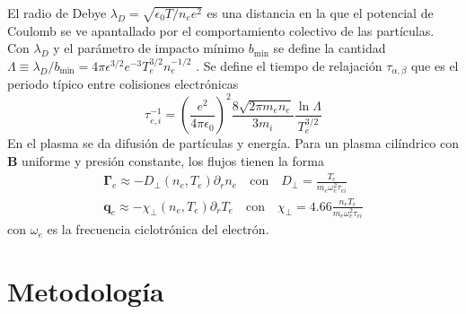  El radio de Debye $\lambda_D = \sqrt{\epsilon_0 T / n_e e^2}$ es una distancia en la que el potencial de Coulomb se ve apantallado por el comportamiento colectivo de las partículas. Con $\lambda_D$ y el parámetro de impacto mínimo $b_\text{min}$ se define la cantidad $\Lambda \equiv \lambda_D/ b_\text{min} = 4\pi \epsilon^{3/2} e^{-3} T_e^{3/2} n_e^{-1/2}$ \cite{goldston1995, helander2005}. Se define el tiempo de relajación $\tau_{\alpha, \beta}$ que es el periodo típico entre colisiones electrónicas
\begin{equation*}
	\tau_{e, i}^{-1} = \left(\frac{e^2}{4\pi\epsilon_0}\right)^2 \frac{8\sqrt{2\pi m_e n_e}}{3 m_i}\frac{\ln{\Lambda}}{T_e^{3/2}}
\end{equation*}
En el plasma se da difusión de partículas y energía. Para un plasma cilíndrico con $\bm{B}$ uniforme y presión constante, los flujos tienen la forma \cite{helander2005}
\begin{eqnarray}\label{eq:diffusion}
	\bm{\Gamma}_e \approx -D_\perp(n_e, T_e) \partial_r n_e \quad \text{con} \quad D_\perp = \frac{T_e}{m_e \omega_e^2 \tau_{ei} } \\
	\bm{q}_e \approx -\chi_\perp(n_e,T_e) \partial_r T_e \quad \text{con} \quad \chi_\perp = 4.66\frac{n_eT_e}{m_e \omega_e^2 \tau_{ei} } 
\end{eqnarray}
con $\omega_e$ es la frecuencia ciclotrónica del electrón. 
\section{Metodología}


